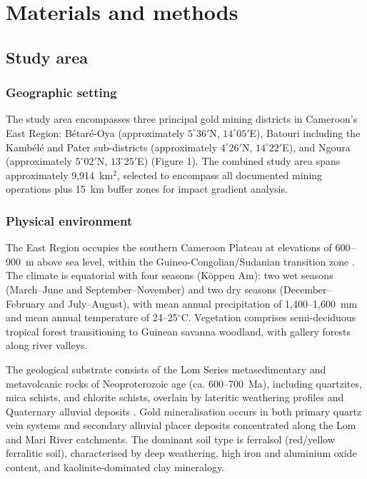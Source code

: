 \documentclass[preprint,12pt,number]{elsarticle}
\begin{document}
\section{Materials and methods}

\subsection{Study area}

\subsubsection{Geographic setting}

The study area encompasses three principal gold mining districts in Cameroon's East Region: B\'{e}tar\'{e}-Oya (approximately $5^{\circ}36'$N, $14^{\circ}05'$E), Batouri including the Kamb\'{e}l\'{e} and Pater sub-districts (approximately $4^{\circ}26'$N, $14^{\circ}22'$E), and Ngoura (approximately $5^{\circ}02'$N, $13^{\circ}25'$E) (Figure 1). The combined study area spans approximately 9,914~km$^{2}$, selected to encompass all documented mining operations plus 15~km buffer zones for impact gradient analysis.

\subsubsection{Physical environment}

The East Region occupies the southern Cameroon Plateau at elevations of 600--900~m above sea level, within the Guineo-Congolian/Sudanian transition zone \cite{White1983, Letouzey1985}. The climate is equatorial with four seasons (K\"{o}ppen Am): two wet seasons (March--June and September--November) and two dry seasons (December--February and July--August), with mean annual precipitation of 1,400--1,600~mm \cite{Funk2015} and mean annual temperature of 24--25$^{\circ}$C. Vegetation comprises semi-deciduous tropical forest transitioning to Guinean savanna woodland, with gallery forests along river valleys.

The geological substrate consists of the Lom Series metasedimentary and metavolcanic rocks of Neoproterozoic age (ca. 600--700~Ma), including quartzites, mica schists, and chlorite schists, overlain by lateritic weathering profiles and Quaternary alluvial deposits \cite{Mimba2018}. Gold mineralisation occurs in both primary quartz vein systems and secondary alluvial placer deposits concentrated along the Lom and Mari River catchments. The dominant soil type is ferralsol (red/yellow ferralitic soil), characterised by deep weathering, high iron and aluminium oxide content, and kaolinite-dominated clay mineralogy.
\end{document}
